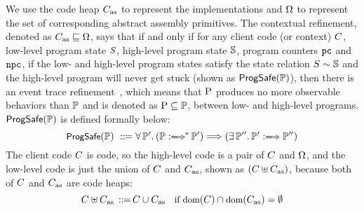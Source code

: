 We use the code heap $C_{\text{as}}$
to represent the implementations
 and $\Omega$ to represent the set of corresponding
abstract assembly primitives.
The contextual refinement,
denoted as $C_{\text{as}} \sqsubseteq \Omega$,
says that if and only if for any client code
(or context) $C$, low-level program
state $S$, high-level program state $\mathbb{S}$, program counters
$\texttt{pc}$ and $\texttt{npc}$, if the low- and high-level program states satisfy the
state relation ${S} \sim {\mathbb{S}}$ and the high-level program
will never get stuck (shown as $\textsf{ProgSafe}(\mathbb{P})$),
then there is an event trace refinement~\cite{liang14lics},
which means that $\text{P}$ produces no more observable behaviors
than $\mathbb{P}$ and is denoted as $\text{P} \subseteq \mathbb{P}$,
between low- and high-level programs. $\textsf{ProgSafe}(\mathbb{P})$
is defined formally below:
\[
    \small
    \progsafe(\HProg) \ \define \
    \forall \, \HProg'. \,
    (\HGlobMultiTrans{\HProg}{}{*}{\HProg'})
    \Longrightarrow
    (\exists \, \HProg''. \,
        \HGlobTrans{\HProg'}{}{\HProg''})
\]
The client code $C$ is \sparc{} code, so
the high-level code is a pair of $C$ and $\Omega$,
and the low-level code is just the union of
$C$ and $C_{\text{as}}$, shown as
$(C\uplus C_{\text{as}})$, because both of
$C$ and $C_{\text{as}}$ are \sparc{} code heaps:
\[
    \small
    C \uplus C_{\text{as}} \,::\!\!{=}\,
    C \cup C_{\text{as}} \quad
    \text{if} \ \text{dom}(C)\cap\text{dom}(C_{\text{as}}) = \emptyset
\]

